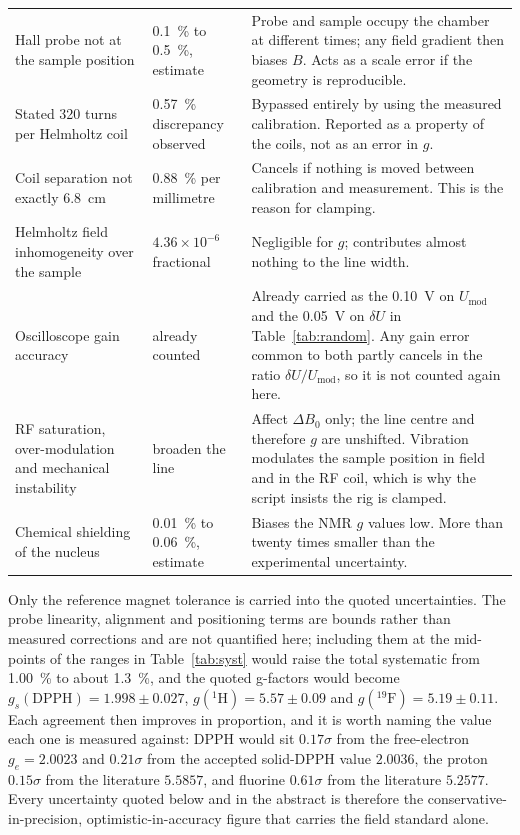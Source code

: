 \documentclass[11pt,a4paper]{article}
\begin{document}
\begin{table}[htbp]
\begin{tabular}{@{}L{3.9cm}L{2.9cm}L{8.8cm}@{}}
Hall probe not at the sample position & \SI{0.1}{\percent} to \SI{0.5}{\percent}, estimate & Probe and sample occupy the chamber at different times; any field gradient then biases $B$. Acts as a scale error if the geometry is reproducible. \\
Stated 320 turns per Helmholtz coil & \SI{0.57}{\percent} discrepancy observed & Bypassed entirely by using the measured calibration. Reported as a property of the coils, not as an error in $g$. \\
Coil separation not exactly \SI{6.8}{\centi\metre} & \SI{0.88}{\percent} per millimetre & Cancels if nothing is moved between calibration and measurement. This is the reason for clamping. \\
Helmholtz field inhomogeneity over the sample & $4.36\times10^{-6}$ fractional & Negligible for $g$; contributes almost nothing to the line width. \\
Oscilloscope gain accuracy & already counted & Already carried as the \SI{0.10}{\volt} on $U_{\mathrm{mod}}$ and the \SI{0.05}{\volt} on $\delta U$ in Table~\ref{tab:random}. Any gain error common to both partly cancels in the ratio $\delta U/U_{\mathrm{mod}}$, so it is not counted again here. \\
RF saturation, over-modulation and mechanical instability & broaden the line & Affect $\Delta B_0$ only; the line centre and therefore $g$ are unshifted. Vibration modulates the sample position in field and in the RF coil, which is why the script insists the rig is clamped. \\
Chemical shielding of the nucleus & \SI{0.01}{\percent} to \SI{0.06}{\percent}, estimate & Biases the NMR $g$ values low. More than twenty times smaller than the experimental uncertainty. \\
\bottomrule
\end{tabular}
\end{table}

Only the reference magnet tolerance is carried into the quoted uncertainties. The probe
linearity, alignment and positioning terms are bounds rather than measured corrections and are
not quantified here; including them at the mid-points of the ranges in Table~\ref{tab:syst} would
raise the total systematic from \SI{1.00}{\percent} to about \SI{1.3}{\percent}, and the quoted
g-factors would become $g_s(\mathrm{DPPH}) = 1.998 \pm 0.027$, $g(^{1}\mathrm{H}) = 5.57 \pm 0.09$
and $g(^{19}\mathrm{F}) = 5.19 \pm 0.11$. Each agreement then improves in proportion, and it is
worth naming the value each one is measured against: DPPH would sit $0.17\sigma$ from the
free-electron $g_e = 2.0023$ and $0.21\sigma$ from the accepted solid-DPPH value $2.0036$, the
proton $0.15\sigma$ from the literature $5.5857$, and fluorine $0.61\sigma$ from the literature
$5.2577$. Every uncertainty quoted below and in the abstract is therefore the
conservative-in-precision, optimistic-in-accuracy figure that carries the field standard alone.
\end{document}
